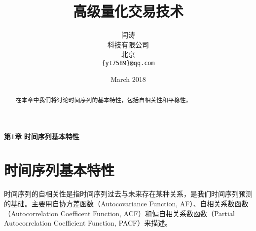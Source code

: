 \documentclass{article}
\title{高级量化交易技术}
\author{
  闫涛 \\
  科技有限公司\\
  北京 \\
  \texttt{\{yt7589\}@qq.com} \\
}
\date{March 2018}
\begin{document}
\maketitle
\begin{center}
\Large \textbf{第1章} \quad \textbf{时间序列基本特性}
\end{center}
\begin{abstract}
在本章中我们将讨论时间序列的基本特性，包括自相关性和平稳性。
\end{abstract}
\section{时间序列基本特性}
时间序列的自相关性是指时间序列过去与未来存在某种关系，是我们时间序列预测的基础。主要用自协方差函数（Autocovariance Function, AF）、自相关系数函数（Autocorrelation Coefficent Function, ACF）和偏自相关系数函数（Partial Autocorrelation Coefficient Function, PACF）来描述。
\end{document}
